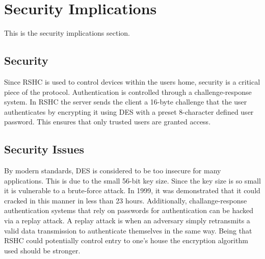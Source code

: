 \section{Security Implications}
\label{sec:security}

This is the security implications section.

\subsection{Security}
\label{sec:security:sec}

Since RSHC is used to control devices within the users home, security is a critical piece of the protocol.  Authentication is controlled through a challenge-response system.  In RSHC the server sends the client a 16-byte challenge that the user authenticates by encrypting it using DES with a preset 8-character defined user password.  This ensures that only trusted users are granted access.

\subsection{Security Issues}
\label{sec:security:issues}

By modern standards, DES is considered to be too insecure for many applications.  This is due to the small 56-bit key size.  Since the key size is so small it is vulnerable to a brute-force attack.  In 1999, it was demonstrated that it could cracked in this manner in less than 23 hours.  Additionally, challange-response authentication systems that rely on passwords for authentication can be hacked via a replay attack.  A replay attack is when an adversary simply retransmits a valid data transmission to authenticate themselves in the same way. Being that RSHC could potentially control entry to one's house the encryption algorithm used should be stronger. 